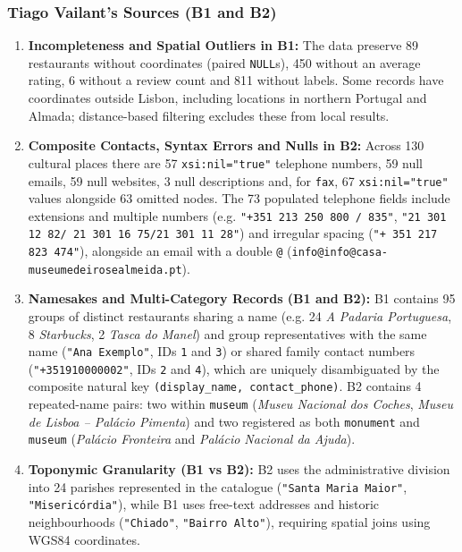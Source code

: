 \subsubsection{Tiago Vailant's Sources (B1 and B2)}
\begin{enumerate}
\item \textbf{Incompleteness and Spatial Outliers in B1:} The data preserve 89 restaurants without coordinates (paired \texttt{NULL}s), 450 without an average rating, 6 without a review count and 811 without labels. Some records have coordinates outside Lisbon, including locations in northern Portugal and Almada; distance-based filtering excludes these from local results.
\item \textbf{Composite Contacts, Syntax Errors and Nulls in B2:} Across 130 cultural places there are 57 \texttt{xsi:nil="true"} telephone numbers, 59 null emails, 59 null websites, 3 null descriptions and, for \texttt{fax}, 67 \texttt{xsi:nil="true"} values alongside 63 omitted nodes. The 73 populated telephone fields include extensions and multiple numbers (e.g. \texttt{"+351 213 250 800 / 835"}, \texttt{"21 301 12 82/ 21 301 16 75/21 301 11 28"}) and irregular spacing (\texttt{"+ 351 217 823 474"}), alongside an email with a double \texttt{@} (\nolinkurl{info@info@casa-museumedeirosealmeida.pt}).
\item \textbf{Namesakes and Multi-Category Records (B1 and B2):} B1 contains 95 groups of distinct restaurants sharing a name (e.g. 24 \emph{A Padaria Portuguesa}, 8 \emph{Starbucks}, 2 \emph{Tasca do Manel}) and group representatives with the same name (\texttt{"Ana Exemplo"}, IDs \texttt{1} and \texttt{3}) or shared family contact numbers (\texttt{"+351910000002"}, IDs \texttt{2} and \texttt{4}), which are uniquely disambiguated by the composite natural key \texttt{(display\_name, contact\_phone)}. B2 contains 4 repeated-name pairs: two within \texttt{museum} (\emph{Museu Nacional dos Coches}, \emph{Museu de Lisboa -- Palácio Pimenta}) and two registered as both \texttt{monument} and \texttt{museum} (\emph{Palácio Fronteira} and \emph{Palácio Nacional da Ajuda}).
\item \textbf{Toponymic Granularity (B1 vs B2):} B2 uses the administrative division into 24 parishes represented in the catalogue (\texttt{"Santa Maria Maior"}, \texttt{"Misericórdia"}), while B1 uses free-text addresses and historic neighbourhoods (\texttt{"Chiado"}, \texttt{"Bairro Alto"}), requiring spatial joins using WGS84 coordinates.
\end{enumerate}

